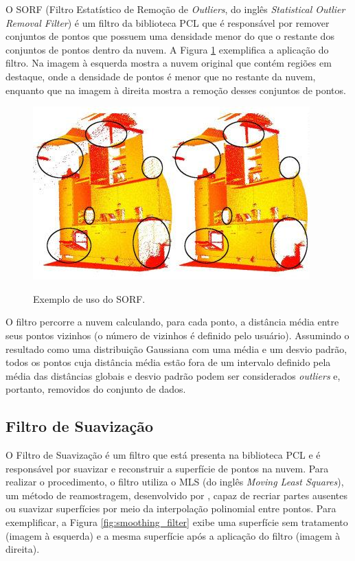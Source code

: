 O SORF (Filtro Estatístico de Remoção de \textit{Outliers}, do inglês \textit{Statistical Outlier Removal Filter}) é um filtro da biblioteca PCL que é responsável por remover conjuntos de pontos que possuem uma densidade menor do que o restante dos conjuntos de pontos dentro da nuvem. 
A Figura \ref{fig:outlier_filter} exemplifica a aplicação do filtro. Na imagem à esquerda mostra a nuvem original que contém regiões em destaque, onde a densidade de pontos é menor que no restante da nuvem, enquanto que na imagem à direita mostra a remoção desses conjuntos de pontos.

\begin{figure}[H]
    \centering
    \caption{Exemplo de uso do SORF.}
    \includegraphics[scale=0.6]{dados/figuras/outlier_filter.jpg}
    \label{fig:outlier_filter}
\end{figure}

O filtro percorre a nuvem calculando, para cada ponto, a distância média entre seus pontos vizinhos (o número de vizinhos é definido pelo usuário). Assumindo o resultado como uma distribuição Gaussiana com uma média e um desvio padrão, todos os pontos cuja distância média estão fora de um intervalo definido pela média das distâncias globais e desvio padrão podem ser considerados \textit{outliers} e, portanto, removidos do conjunto de dados.

\subsection{Filtro de Suavização}
\label{sec:smoothing_filter}

O Filtro de Suavização é um filtro que está presenta na biblioteca PCL e é responsável por suavizar e reconstruir a superfície de pontos na nuvem. 
Para realizar o procedimento, o filtro utiliza o MLS (do inglês \textit{Moving Least Squares}), um método de reamostragem, desenvolvido por \cite{levin1998mls}, capaz de recriar partes ausentes ou suavizar superfícies por meio da interpolação polinomial entre pontos. 
Para exemplificar, a Figura \ref{fig:smoothing_filter} exibe uma superfície sem tratamento (imagem à esquerda) e a mesma superfície após a aplicação do filtro (imagem à direita).

